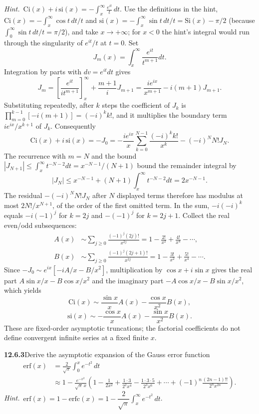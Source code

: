 \emph{Hint.}~$\mathrm{Ci}(x)+i\,\mathrm{si}(x)
=-\displaystyle\int_{x}^{\infty}\frac{e^{it}}{t}\,dt$.
\solution
Use the definitions in the hint, $\mathrm{Ci}(x)=-\int_x^\infty\cos t\,dt/t$
and $\mathrm{si}(x)=-\int_x^\infty\sin t\,dt/t=\mathrm{Si}(x)-\pi/2$
(because $\int_0^\infty\sin t\,dt/t=\pi/2$), and take $x\to+\infty$; for
$x<0$ the hint's integral would run through the singularity of
$e^{it}/t$ at $t=0$. Set
\[
J_m(x)=\int_x^\infty\frac{e^{it}}{t^{m+1}}dt.
\]
Integration by parts with $dv=e^{it}dt$ gives
\[
J_m=\left[\frac{e^{it}}{it^{m+1}}\right]_x^\infty
 +\frac{m+1}{i}J_{m+1}
=\frac{i e^{ix}}{x^{m+1}}-i(m+1)J_{m+1}.
\]
Substituting repeatedly, after $k$ steps the coefficient of $J_k$ is
$\prod_{m=0}^{k-1}[-i(m+1)]=(-i)^kk!$, and it multiplies the boundary
term $ie^{ix}/x^{k+1}$ of $J_k$. Consequently
\[
\mathrm{Ci}(x)+i\,\mathrm{si}(x)=-J_0
=-\frac{i e^{ix}}x\sum_{k=0}^{N-1}\frac{(-i)^kk!}{x^k}
-(-i)^NN!J_N.
\]
The recurrence with $m=N$ and the bound
$|J_{N+1}|\le\int_x^\infty t^{-N-2}dt=x^{-N-1}/(N+1)$ bound the
remainder integral by
\[
|J_N|\le x^{-N-1}+(N+1)\int_x^\infty t^{-N-2}dt
=2x^{-N-1}.
\]
The residual $-(-i)^NN!J_N$ after $N$ displayed terms therefore has
modulus at most $2N!/x^{N+1}$, of the order of the first omitted term.
In the sum, $-i(-i)^k$ equals $-i(-1)^j$ for $k=2j$ and $-(-1)^j$ for
$k=2j+1$. Collect the real even/odd subsequences:
\begin{align*}
A(x)&\sim\sum_{j\ge0}\frac{(-1)^j(2j)!}{x^{2j}}
=1-\frac{2!}{x^2}+\frac{4!}{x^4}-\cdots,\\
B(x)&\sim\sum_{j\ge0}\frac{(-1)^j(2j+1)!}{x^{2j}}
=1-\frac{3!}{x^2}+\frac{5!}{x^4}-\cdots.
\end{align*}
Since $-J_0\sim e^{ix}[-iA/x-B/x^2]$, multiplication by
$\cos x+i\sin x$ gives the real part $A\sin x/x-B\cos x/x^2$ and the
imaginary part $-A\cos x/x-B\sin x/x^2$, which yields
\[
\boxed{\mathrm{Ci}(x)\sim\frac{\sin x}{x}A(x)
-\frac{\cos x}{x^2}B(x)},
\]
\[
\boxed{\mathrm{si}(x)\sim-\frac{\cos x}{x}A(x)
-\frac{\sin x}{x^2}B(x)}.
\]
These are fixed-order asymptotic truncations; the factorial coefficients
do not define convergent infinite series at a fixed finite $x$.

\par\bigskip
\noindent\textbf{12.6.3}\quad Derive the asymptotic expansion of the Gauss
error function 
\begin{align*}
\mathrm{erf}(x)&=\frac{2}{\sqrt{\pi}}\int_{0}^{x}e^{-t^{2}}\,dt\\
&\approx1-\frac{e^{-x^{2}}}{\sqrt{\pi}\,x}\left(1-\frac{1}{2x^{2}}
+\frac{1\cdot3}{2^{2}x^{4}}-\frac{1\cdot3\cdot5}{2^{3}x^{6}}+\cdots
+(-1)^{n}\frac{(2n-1)!!}{2^{n}x^{2n}}\right).
\end{align*}
\emph{Hint.}~$\mathrm{erf}(x)=1-\mathrm{erfc}(x)
=1-\dfrac{2}{\sqrt{\pi}}\displaystyle\int_{x}^{\infty}e^{-t^{2}}\,dt$.

